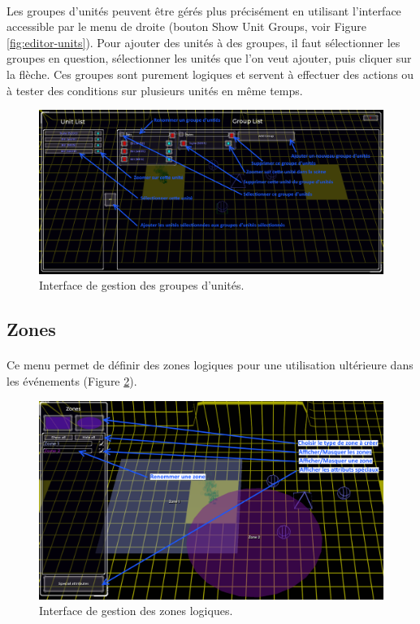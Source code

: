 \documentclass[a4paper]{article}
\begin{document}
\paragraph{ }
Les groupes d'unités peuvent être gérés plus précisément en utilisant l'interface accessible par le menu de droite (bouton Show Unit Groups, voir Figure \ref{fig:editor-units}). Pour ajouter des unités à des groupes, il faut sélectionner les groupes en question, sélectionner les unités que l'on veut ajouter, puis cliquer sur la flèche. Ces groupes sont purement logiques et servent à effectuer des actions ou à tester des conditions sur plusieurs unités en même temps.
\begin{figure}[H]
\centering
\includegraphics[width=\linewidth]{editor-groups.png}
\caption{Interface de gestion des groupes d'unités.}
\label{fig:editor-groups}
\end{figure}
\subsection{Zones}
\paragraph{ }
Ce menu permet de définir des zones logiques pour une utilisation ultérieure dans les événements (Figure \ref{fig:editor-zones}).
\begin{figure}[H]
\centering
\includegraphics[width=\linewidth]{editor-zones.png}
\caption{Interface de gestion des zones logiques.}
\label{fig:editor-zones}
\end{figure}
\end{document}
